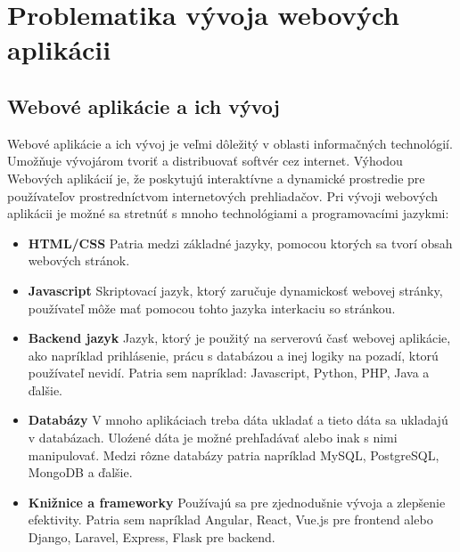 \section{Problematika vývoja webových aplikácii}
\subsection{Webové aplikácie a ich vývoj}
Webové aplikácie a ich vývoj je veľmi dôležitý v oblasti informačných technológií. Umožňuje vývojárom tvoriť a distribuovať softvér cez internet. Výhodou Webových aplikácií je, že poskytujú interaktívne a dynamické prostredie pre používateľov prostredníctvom internetových prehliadačov. Pri vývoji webových aplikácii je možné sa stretnúť s mnoho technológiami a programovacími jazykmi\cite{create_web_app}:
\begin{itemize}
    \item \textbf{HTML/CSS}  Patria medzi základné jazyky, pomocou ktorých sa tvorí obsah webových stránok.
    \item \textbf{Javascript} Skriptovací jazyk, ktorý zaručuje dynamickosť webovej stránky, používateľ môže mať pomocou tohto jazyka interkaciu so stránkou.
    \item \textbf{Backend jazyk} Jazyk, ktorý je použitý na serverovú časť webovej aplikácie, ako napríklad prihlásenie, prácu s databázou a inej logiky na pozadí, ktorú používateľ nevidí. Patria sem napríklad: Javascript, Python, PHP, Java a ďalšie.
    \item \textbf{Databázy} V mnoho aplikáciach treba dáta ukladať a tieto dáta sa ukladajú v databázach. Uloźené dáta je možné prehľadávať alebo inak s nimi manipulovať. Medzi rôzne databázy patria napríklad MySQL, PostgreSQL, MongoDB a ďalšie.
    \item \textbf{Knižnice a frameworky} Používajú sa pre zjednodušnie vývoja a zlepšenie efektivity. Patria sem napríklad Angular, React, Vue.js pre frontend alebo Django, Laravel, Express, Flask pre backend.
\end{itemize}
